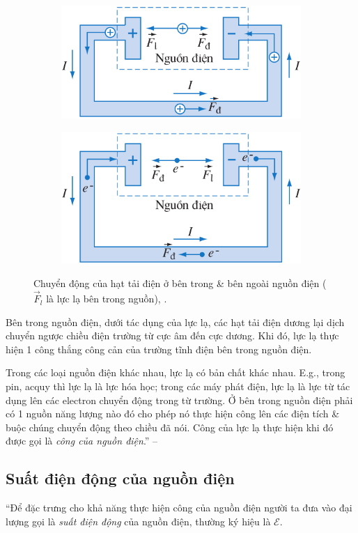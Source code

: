 \documentclass[oneside]{book}
\numberwithin{equation}{section}
\begin{document}
\begin{itemize}
	\begin{figure}[H]
		\centering
		\begin{subfigure}{.5\textwidth}
			\centering
			\includegraphics[width=.49\linewidth]{chuyen_dong_hat_tai_dien_ben_trong_ben_ngoai_nguon_dien_a}
			\caption{}
			\label{chuyen_dong_hat_tai_dien_ben_trong_ben_ngoai_nguon_dien_a}
		\end{subfigure}%
		\begin{subfigure}{.5\textwidth}
			\centering
			\includegraphics[width=.49\linewidth]{chuyen_dong_hat_tai_dien_ben_trong_ben_ngoai_nguon_dien_b}
			\caption{}
			\label{chuyen_dong_hat_tai_dien_ben_trong_ben_ngoai_nguon_dien_b}
		\end{subfigure}
		\caption{Chuyển động của hạt tải điện ở bên trong \& bên ngoài nguồn điện ($\vec{F}_l$ là lực lạ bên trong nguồn), \cite[Hình 10.3, p. 50]{SGK_Vat_Ly_11_nang_cao}.}
		\label{fig:chuyen_dong_hat_tai_dien_ben_trong_ben_ngoai_nguon_dien}
	\end{figure}
	Bên trong nguồn điện, dưới tác dụng của lực lạ, các hạt tải điện dương lại dịch chuyển ngược chiều điện trường từ cực âm đến cực dương. Khi đó, lực lạ thực hiện 1 công thắng công cản của trường tĩnh điện bên trong nguồn điện.
\end{itemize}
Trong các loại nguồn điện khác nhau, lực lạ có bản chất khác nhau. E.g., trong pin, acquy thì lực lạ là lực hóa học; trong các máy phát điện, lực lạ là lực từ tác dụng lên các electron chuyển động trong từ trường. Ở bên trong nguồn điện phải có 1 nguồn năng lượng nào đó cho phép nó thực hiện công lên các điện tích \& buộc chúng chuyển động theo chiều đã nói. Công của lực lạ thực hiện khi đó được gọi là \textit{công của nguồn điện}.'' -- \cite[p. 50]{SGK_Vat_Ly_11_nang_cao}

\subsection{Suất điện động của nguồn điện}
``Để đặc trưng cho khả năng thực hiện công của nguồn điện người ta đưa vào đại lượng gọi là \textit{suất điện động} của nguồn điện, thường ký hiệu là $\mathcal{E}$.
\end{document}

